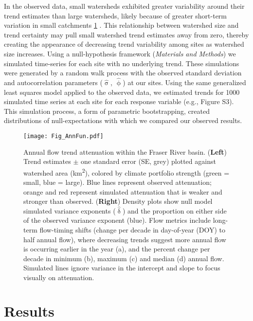 \documentclass[9pt,twocolumn,twoside,lineno]{pnas-new}
\begin{document}
In the observed data, small watersheds exhibited greater variability around their trend estimates than large watersheds, likely because of greater short-term variation in small catchments \ref{fig:3} \citep{Moore:2015}. This relationship between watershed size and trend certainty may pull small watershed trend estimates away from zero, thereby creating the appearance of decreasing trend variability among sites as watershed size increases. Using a null-hypothesis framework (\textit{Materials and Methods}) we simulated time-series for each site with no underlying trend. These simulations were generated by a random walk process with the observed standard deviation and autocorrelation parameters ($\hat{\upsigma}$, $\hat{\upphi}$) at our sites. Using the same generalized least squares model applied to the observed data, we estimated trends for 1000 simulated time series at each site for each response variable (e.g., Figure S3). This simulation process, a form of parametric bootstrapping, created distributions of null-expectations with which we compared our observed results.

\begin{figure}[h]
\centering
\texttt{[image: Fig\_AnnFun.pdf]}
	\caption{Annual flow trend attenuation within the Fraser River basin. (\textbf{Left}) Trend estimates $\pm$ one standard error (SE, grey) plotted against watershed area (km\textsuperscript{2}), colored by climate portfolio strength (green = small, blue = large). Blue lines represent observed attenuation; orange and red represent simulated attenuation that is weaker and stronger than observed. (\textbf{Right}) Density plots show null model simulated variance exponents ($\hat{\updelta}$) and the proportion on either side of the observed variance exponent (blue). Flow metrics include long-term flow-timing shifts (change per decade in day-of-year (DOY) to half annual flow), where decreasing trends suggest more annual flow is occurring earlier in the year (a), and the percent change per decade in minimum (b), maximum (c) and median (d) annual flow. Simulated lines ignore variance in the intercept and slope to focus visually on attenuation.}
\label{fig:3}
\end{figure}

\section*{Results}
\end{document}
